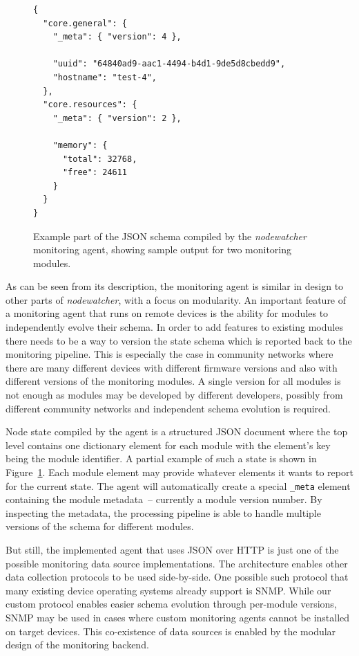\documentclass[5p,sort&compress]{elsarticle}
\newcommand{\nodewatcher}{\textit{nodewatcher}}
\begin{document}
\begin{figure}[t]
\centering
\begin{verbatim}
{
  "core.general": {
    "_meta": { "version": 4 },
    
    "uuid": "64840ad9-aac1-4494-b4d1-9de5d8cbedd9",
    "hostname": "test-4",
  },
  "core.resources": {
    "_meta": { "version": 2 },
    
    "memory": {
      "total": 32768,
      "free": 24611
    }
  }
}
\end{verbatim}
\caption{Example part of the JSON schema compiled by the \nodewatcher{} monitoring agent, showing sample output for two monitoring modules.}
\label{fig:monitoring-json-schema}
\end{figure}

As can be seen from its description, the monitoring agent is similar in design to other parts of \nodewatcher{}, with a focus on modularity.
An important feature of a monitoring agent that runs on remote devices is the ability for modules to independently evolve their schema.
In order to add features to existing modules there needs to be a way to version the state schema which is reported back to the monitoring pipeline.
This is especially the case in community networks where there are many different devices with different firmware versions and also with different versions of the monitoring modules.
A single version for all modules is not enough as modules may be developed by different developers, possibly from different community networks and independent schema evolution is required.

Node state compiled by the agent is a structured JSON document where the top level contains one dictionary element for each module with the element's key being the module identifier.
A partial example of such a state is shown in Figure~\ref{fig:monitoring-json-schema}.
Each module element may provide whatever elements it wants to report for the current state.
The agent will automatically create a special \texttt{\_meta} element containing the module metadata~-- currently a module version number.
By inspecting the metadata, the processing pipeline is able to handle multiple versions of the schema for different modules.

But still, the implemented agent that uses JSON over HTTP is just one of the possible monitoring data source implementations.
The architecture enables other data collection protocols to be used side-by-side.
One possible such protocol that many existing device operating systems already support is SNMP.
While our custom protocol enables easier schema evolution through per-module versions, SNMP may be used in cases where custom monitoring agents cannot be installed on target devices.
This co-existence of data sources is enabled by the modular design of the monitoring backend.
\end{document}
